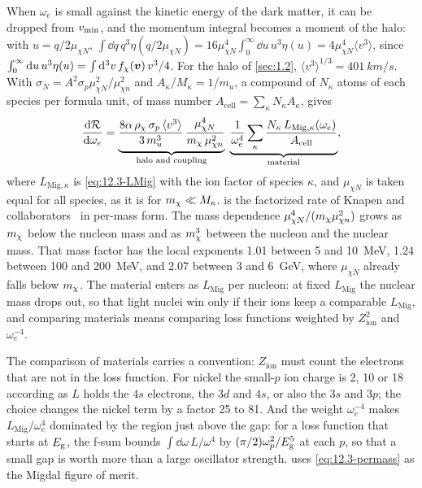 When $\omega_e$ is small against the kinetic energy of the dark matter, it can be dropped from $v_{\mathrm{min}}$, and the momentum integral becomes a moment of the halo: with $u = q/2\mu_{\chi N}$, $\int\dd q\,q^3\eta(q/2\mu_{\chi N}) = 16\mu_{\chi N}^4\int_0^\infty\dd u\,u^3\eta(u) = 4\mu_{\chi N}^4\langle v^3\rangle$, since $\int_0^\infty\mathrm{d} u\,u^3\eta(u) = \int\mathrm{d}^3v\,f_\chi(\bm{v})\,v^3/4$. For the halo of \cref{sec:1.2}, $\langle v^3\rangle^{1/3} = \SI{401}{km/s}$. With $\sigma_N = A^2\sigma_p\mu_{\chi N}^2/\mu_{\chi n}^2$ and $A_\kappa/M_\kappa = 1/m_u$, a compound of $N_\kappa$ atoms of each species per formula unit, of mass number $A_{\mathrm{cell}} = \sum_\kappa N_\kappa A_\kappa$, gives
\begin{equation}
  \frac{\mathrm{d}\mathcal{R}}{\mathrm{d}\omega_e} = \underbrace{\frac{8\alpha\,\rho_\chi\,\sigma_p\,\langle v^3\rangle}{3\,m_u^3}\,\frac{\mu_{\chi N}^4}{m_{\chi}\,\mu_{\chi n}^2}}_{\text{halo and coupling}}\;\underbrace{\frac{1}{\omega_e^4}\sum_\kappa\frac{N_\kappa\,L_{\mathrm{Mig},\kappa}(\omega_e)}{A_{\mathrm{cell}}}}_{\text{material}} ,
  \label{eq:12.3-permass}
\end{equation}
where $L_{\mathrm{Mig},\kappa}$ is \cref{eq:12.3-LMig} with the ion factor of species $\kappa$, and $\mu_{\chi N}$ is taken equal for all species, as it is for $m_{\chi} \ll M_\kappa$.  is the factorized rate of Knapen and collaborators~\cite[Eqs.~(1), (6) and (A36)]{knapen2021migdal} in per-mass form. The mass dependence $\mu_{\chi N}^4/(m_{\chi}\mu_{\chi n}^2)$ grows as $m_{\chi}$ below the nucleon mass and as $m_{\chi}^3$ between the nucleon and the nuclear mass. That mass factor has the local exponents 1.01 between 5 and \SI{10}{MeV}, 1.24 between 100 and \SI{200}{MeV}, and 2.07 between 3 and \SI{6}{GeV}, where $\mu_{\chi N}$ already falls below $m_{\chi}$. The material enters as $L_{\mathrm{Mig}}$ per nucleon: at fixed $L_{\mathrm{Mig}}$ the nuclear mass drops out, so that light nuclei win only if their ions keep a comparable $L_{\mathrm{Mig}}$, and comparing materials means comparing loss functions weighted by $Z_{\mathrm{ion}}^2$ and $\omega_e^{-4}$.

The comparison of materials carries a convention: $Z_{\mathrm{ion}}$ must count the electrons that are not in the loss function. For nickel the small-$p$ ion charge is 2, 10 or 18 according as $L$ holds the $4s$ electrons, the $3d$ and $4s$, or also the $3s$ and $3p$; the choice changes the nickel term by a factor 25 to 81. And the weight $\omega_e^{-4}$ makes $L_{\mathrm{Mig}}/\omega_e^4$ dominated by the region just above the gap: for a loss function that starts at $E_{\mathrm{g}}$, the f-sum bounds $\int\dd\omega\,L/\omega^4$ by $(\pi/2)\omega_p^2/E_{\mathrm{g}}^5$ at each $p$, so that a small gap is worth more than a large oscillator strength.  uses \cref{eq:12.3-permass} as the Migdal figure of merit.

